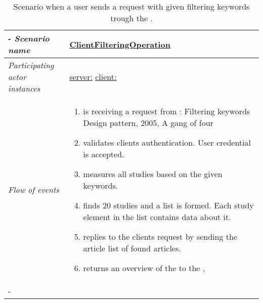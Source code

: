 %
%
\begin{table}[h!]
	\tabulinesep=1.5mm
	\begin{tabu} to 
		\tabucline[1.5pt]-
		\textit{Scenario name} & \underline{ClientFilteringOperation} \\
		\hline
		\textit{Participating actor 
		\newline instances} & \underline{server:\serverside}
		\newline \underline{client:\clientside} \\
		\hline
		\textit{Flow of events} &
		\vspace{-3mm}
		\begin{enumerate}[leftmargin=*,topsep=0pt,itemsep=-1ex]
			\item \serverside is receiving a request from \clientside: Filtering keywords {Design pattern, 2005, A gang of four}
			
			\item \serverside validates clients authentication. User credential is accepted.
			
			\item \serverside measures all studies based on the given keywords.
			
			\item \serverside finds 20 studies and a list is formed. Each study element in the list contains data about it.
			
			\item \serverside replies to the clients request by sending the article list of found articles.
			
			\item \serverside returns an overview of the \studyconfig to the \clientside, 
		\end{enumerate} \\
		\tabucline[1.5pt]-
	\end{tabu}
		\caption{Scenario when a user sends a request with given filtering keywords trough the \clientside.}
		\label{sc:ClientFilteringOperation}
\end{table}




